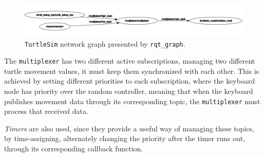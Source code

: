 \begin{figure}[H]
        \centering
        \includegraphics[width=\linewidth]{images/ts_rqt_graph.png}
        \caption{\texttt{TurtleSim} network graph presented by \texttt{rqt\_graph}.}
        \label{fig:ts-rqt-graph}
\end{figure}



The \texttt{multiplexer} has two different active subscriptions, managing two different turtle movement values, it must keep them synchronized with each other. This is achieved by setting different priorities to each subscription, where the keyboard node has priority over the random controller, meaning that when the keyboard publishes movement data through its corresponding topic, the \texttt{multiplexer} must process that received data. 

\textit{Timers} are also used, since they provide a useful way of managing these topics, by time-assigning, alternately changing the priority after the timer runs out, through its corresponding callback function.


